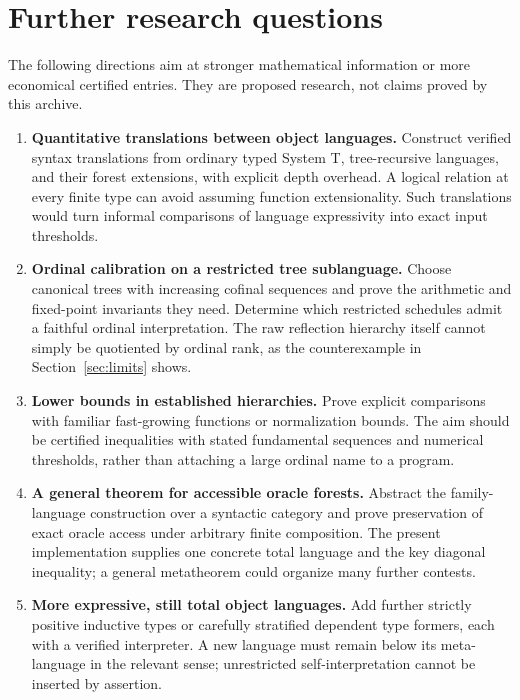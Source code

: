 \documentclass[11pt,a4paper]{article}
\theoremstyle{definition}
\begin{document}
\section{Further research questions}
\label{sec:research}

The following directions aim at stronger mathematical information or more
economical certified entries. They are proposed research, not claims proved
by this archive.

\begin{enumerate}[label=\textbf{\arabic*.},leftmargin=*]
\item \textbf{Quantitative translations between object languages.}
Construct verified syntax translations from ordinary typed System T,
tree-recursive languages, and their forest extensions, with explicit depth
overhead. A logical relation at every finite type can avoid assuming
function extensionality. Such translations would turn informal comparisons
of language expressivity into exact input thresholds.

\item \textbf{Ordinal calibration on a restricted tree sublanguage.}
Choose canonical trees with increasing cofinal sequences and prove the
arithmetic and fixed-point invariants they need. Determine which restricted
schedules admit a faithful ordinal interpretation. The raw reflection
hierarchy itself cannot simply be quotiented by ordinal rank, as the
counterexample in Section~\ref{sec:limits} shows.

\item \textbf{Lower bounds in established hierarchies.}
Prove explicit comparisons with familiar fast-growing functions or
normalization bounds. The aim should be certified inequalities with stated
fundamental sequences and numerical thresholds, rather than attaching a
large ordinal name to a program.

\item \textbf{A general theorem for accessible oracle forests.}
Abstract the family-language construction over a syntactic category and
prove preservation of exact oracle access under arbitrary finite
composition. The present implementation supplies one concrete total
language and the key diagonal inequality; a general metatheorem could
organize many further contests.

\item \textbf{More expressive, still total object languages.}
Add further strictly positive inductive types or carefully stratified
dependent type formers, each with a verified interpreter. A new language
must remain below its meta-language in the relevant sense; unrestricted
self-interpretation cannot be inserted by assertion.


\end{enumerate}
\end{document}
